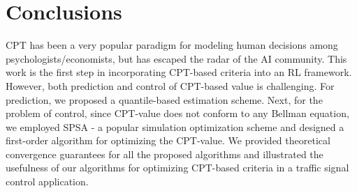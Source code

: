 \documentclass[twocolumn]{IEEEtran}
\begin{document}




\section{Conclusions}
\label{sec:conclusions}
CPT has been a very popular paradigm for modeling human decisions among psychologists/economists, but has escaped the radar of the AI community. This work is the first step in incorporating CPT-based criteria into an RL framework. However, both prediction and control of CPT-based value is challenging. 
For prediction, we proposed a quantile-based estimation scheme. Next, for the problem of control, since CPT-value does not conform to any Bellman equation, we employed SPSA - a popular simulation optimization scheme and designed a first-order algorithm for optimizing the CPT-value. 
We provided theoretical convergence guarantees for all the proposed algorithms and illustrated the usefulness of our algorithms for optimizing CPT-based criteria in a traffic signal control application.



%






\end{document}
